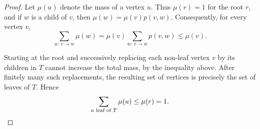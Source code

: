 \documentclass[10pt,a4paper]{amsart}
\begin{document}
\begin{proof}
Let $\mu(u)$ denote the mass of a vertex $u$. Thus $\mu(r)=1$ for the
root $r$, and if $w$ is a child of $v$, then
$\mu(w)=\mu(v)p(v,w)$.
Consequently, for every vertex $v$,
\begin{equation*}
      \sum_{w:\,v\to w}\mu(w)
    =
    \mu(v)\sum_{w:\,v\to w}p(v,w)
    \le \mu(v).
\end{equation*}

Starting at the root and successively
replacing each non-leaf vertex $v$ by its children in
$T$ cannot increase the total mass, by the inequality
above. After finitely many such replacements, the resulting set of
vertices is precisely the set of leaves of $T$. Hence
\begin{equation*}
    \sum_{u \text{ leaf of }T}\mu(u)\le \mu(r)=1. \qedhere
\end{equation*}
    
\end{proof}
\end{document}
